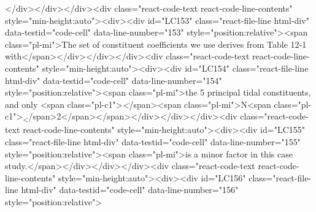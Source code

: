 {{</div></div></div><div class="react-code-text react-code-line-contents" style="min-height:auto"><div><div id="LC153" class="react-file-line html-div" data-testid="code-cell" data-line-number="153" style="position:relative"><span class="pl-mi">The set of constituent coefficients we use derives from Table 12-1 with</span></div></div></div><div class="react-code-text react-code-line-contents" style="min-height:auto"><div><div id="LC154" class="react-file-line html-div" data-testid="code-cell" data-line-number="154" style="position:relative"><span class="pl-mi">the 5 principal tidal constituents, and only <span class="pl-c1">\emph</span>{<span class="pl-mi">N<span class="pl-c1">\textsubscript</span>{2}</span>}</span></div></div></div><div class="react-code-text react-code-line-contents" style="min-height:auto"><div><div id="LC155" class="react-file-line html-div" data-testid="code-cell" data-line-number="155" style="position:relative"><span class="pl-mi">is a minor factor in this case study.</span></div></div></div><div class="react-code-text react-code-line-contents" style="min-height:auto"><div><div id="LC156" class="react-file-line html-div" data-testid="code-cell" data-line-number="156" style="position:relative">
}}
